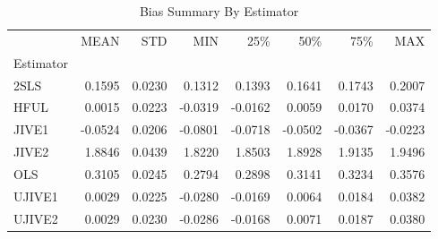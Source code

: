 \begin{table}[ht]
\centering
\caption{Bias Summary By Estimator}
\begin{tabular}{lrrrrrrr}
\toprule
 & MEAN & STD & MIN & 25\% & 50\% & 75\% & MAX \\
Estimator &  &  &  &  &  &  &  \\
\midrule
2SLS & 0.1595 & 0.0230 & 0.1312 & 0.1393 & 0.1641 & 0.1743 & 0.2007 \\
HFUL & 0.0015 & 0.0223 & -0.0319 & -0.0162 & 0.0059 & 0.0170 & 0.0374 \\
JIVE1 & -0.0524 & 0.0206 & -0.0801 & -0.0718 & -0.0502 & -0.0367 & -0.0223 \\
JIVE2 & 1.8846 & 0.0439 & 1.8220 & 1.8503 & 1.8928 & 1.9135 & 1.9496 \\
OLS & 0.3105 & 0.0245 & 0.2794 & 0.2898 & 0.3141 & 0.3234 & 0.3576 \\
UJIVE1 & 0.0029 & 0.0225 & -0.0280 & -0.0169 & 0.0064 & 0.0184 & 0.0382 \\
UJIVE2 & 0.0029 & 0.0230 & -0.0286 & -0.0168 & 0.0071 & 0.0187 & 0.0380 \\
\bottomrule
\end{tabular}
\end{table}

